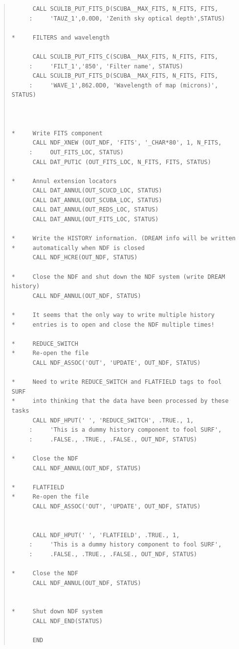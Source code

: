 \documentclass[twoside,11pt]{article}
\newenvironment{myquote}{\begin{quote}\begin{small}}{\end{small}\end{quote}}
\renewcommand{\_}{\texttt{\symbol{95}}}
\begin{document}
\begin{myquote}
\begin{verbatim}
      CALL SCULIB_PUT_FITS_D(SCUBA__MAX_FITS, N_FITS, FITS,
     :     'TAUZ_1',0.0D0, 'Zenith sky optical depth',STATUS)

*     FILTERS and wavelength

      CALL SCULIB_PUT_FITS_C(SCUBA__MAX_FITS, N_FITS, FITS,
     :     'FILT_1','850', 'Filter name', STATUS)
      CALL SCULIB_PUT_FITS_D(SCUBA__MAX_FITS, N_FITS, FITS,
     :     'WAVE_1',862.0D0, 'Wavelength of map (microns)', STATUS)



*     Write FITS component
      CALL NDF_XNEW (OUT_NDF, 'FITS', '_CHAR*80', 1, N_FITS,
     :     OUT_FITS_LOC, STATUS)
      CALL DAT_PUT1C (OUT_FITS_LOC, N_FITS, FITS, STATUS)

*     Annul extension locators
      CALL DAT_ANNUL(OUT_SCUCD_LOC, STATUS)
      CALL DAT_ANNUL(OUT_SCUBA_LOC, STATUS)
      CALL DAT_ANNUL(OUT_REDS_LOC, STATUS)
      CALL DAT_ANNUL(OUT_FITS_LOC, STATUS)

*     Write the HISTORY information. (DREAM info will be written
*     automatically when NDF is closed
      CALL NDF_HCRE(OUT_NDF, STATUS)

*     Close the NDF and shut down the NDF system (write DREAM history)
      CALL NDF_ANNUL(OUT_NDF, STATUS)

*     It seems that the only way to write multiple history
*     entries is to open and close the NDF multiple times!

*     REDUCE_SWITCH
*     Re-open the file
      CALL NDF_ASSOC('OUT', 'UPDATE', OUT_NDF, STATUS)

*     Need to write REDUCE_SWITCH and FLATFIELD tags to fool SURF
*     into thinking that the data have been processed by these tasks
      CALL NDF_HPUT(' ', 'REDUCE_SWITCH', .TRUE., 1,
     :     'This is a dummy history component to fool SURF',
     :     .FALSE., .TRUE., .FALSE., OUT_NDF, STATUS)

*     Close the NDF
      CALL NDF_ANNUL(OUT_NDF, STATUS)

*     FLATFIELD
*     Re-open the file
      CALL NDF_ASSOC('OUT', 'UPDATE', OUT_NDF, STATUS)


      CALL NDF_HPUT(' ', 'FLATFIELD', .TRUE., 1,
     :     'This is a dummy history component to fool SURF',
     :     .FALSE., .TRUE., .FALSE., OUT_NDF, STATUS)

*     Close the NDF
      CALL NDF_ANNUL(OUT_NDF, STATUS)


*     Shut down NDF system
      CALL NDF_END(STATUS)

      END
\end{verbatim}
\end{myquote}
\end{document}

